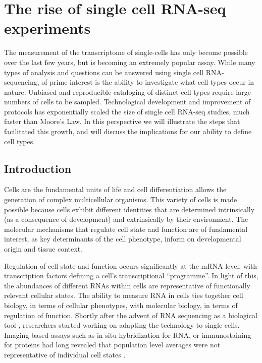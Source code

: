 
\chapter{The rise of single cell RNA-seq experiments} \label{ch:intro}

\graphicspath{{Chapter1/Figs/}}

The measurement of the transcriptome of single-cells has only become possible over the last few years, but is becoming an extremely popular assay. While many types of analysis and questions can be answered using single cell RNA-sequencing, of prime interest is the ability to investigate what cell types occur in nature. Unbiased and reproducible cataloging of distinct cell types require large numbers of cells to be sampled. Technological development and improvement of protocols has exponentially scaled the size of single cell RNA-seq studies, much faster than Moore’s Law. In this perspective we will illustrate the steps that facilitated this growth, and will discuss the implications for our ability to define cell types.

\section{Introduction}

Cells are the fundamental units of life and cell differentiation allows the generation of complex multicellular organisms. This variety of cells is made possible because cells exhibit different identities that are determined intrinsically (as a consequence of development) and extrinsically by their environment. The molecular mechanisms that regulate cell state and function are of fundamental interest, as key determinants of the cell phenotype, inform on developmental origin and tissue context.

Regulation of cell state and function occurs significantly at the mRNA level, with transcription factors defining a cell’s transcriptional “programme”. In light of this, the abundances of different RNAs within cells are representative of functionally relevant cellular states. The ability to measure RNA in cells ties together cell biology, in terms of cellular phenotypes, with molecular biology, in terms of regulation of function. Shortly after the advent of RNA sequencing as a biological tool \cite{Mortazavi2008-rq}, researchers started working on adapting the technology to single cells. Imaging-based assays such as in situ hybridization for RNA, or immunostaining for proteins had long revealed that population level averages were not representative of individual cell states \cite{Raj2008-wj}.

